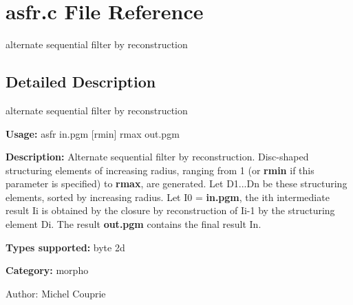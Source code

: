 \section{asfr.c File Reference}
\label{asfr_8c}
alternate sequential filter by reconstruction  




\label{_details}
\subsection{Detailed Description}
alternate sequential filter by reconstruction 

{\bf Usage:} asfr in.pgm [rmin] rmax out.pgm

{\bf Description:} Alternate sequential filter by reconstruction. Disc-shaped structuring elements of increasing radius, ranging from 1 (or {\bf rmin} if this parameter is specified) to {\bf rmax}, are generated. Let D1...Dn be these structuring elements, sorted by increasing radius. Let I0 = {\bf in.pgm}, the ith intermediate result Ii is obtained by the closure by reconstruction of Ii-1 by the structuring element Di. The result {\bf out.pgm} contains the final result In.

{\bf Types supported:} byte 2d

{\bf Category:} morpho

\begin{Desc}
\item[Author:]Michel Couprie \end{Desc}
